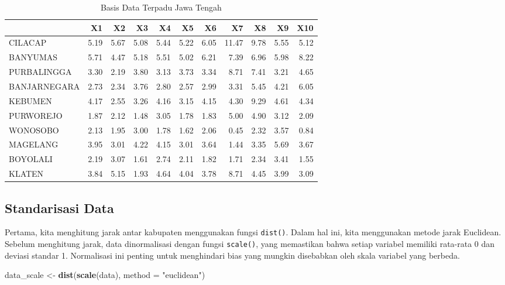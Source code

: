 \documentclass[
  oneside]{book}
\newenvironment{Shaded}{\begin{snugshade}}{\end{snugshade}}
\newcommand{\AttributeTok}[1]{\textcolor[rgb]{0.13,0.29,0.53}{#1}}
\newcommand{\FunctionTok}[1]{\textcolor[rgb]{0.13,0.29,0.53}{\textbf{#1}}}
\newcommand{\NormalTok}[1]{#1}
\newcommand{\OtherTok}[1]{\textcolor[rgb]{0.56,0.35,0.01}{#1}}
\newcommand{\StringTok}[1]{\textcolor[rgb]{0.31,0.60,0.02}{#1}}
\begin{document}
\begin{table}

\caption{\label{tab:nice-tab-2}Basis Data Terpadu Jawa Tengah}
\centering
\begin{tabular}[t]{lrrrrrrrrrr}
\toprule
  & X1 & X2 & X3 & X4 & X5 & X6 & X7 & X8 & X9 & X10\\
\midrule
CILACAP & 5.19 & 5.67 & 5.08 & 5.44 & 5.22 & 6.05 & 11.47 & 9.78 & 5.55 & 5.12\\
BANYUMAS & 5.71 & 4.47 & 5.18 & 5.51 & 5.02 & 6.21 & 7.39 & 6.96 & 5.98 & 8.22\\
PURBALINGGA & 3.30 & 2.19 & 3.80 & 3.13 & 3.73 & 3.34 & 8.71 & 7.41 & 3.21 & 4.65\\
BANJARNEGARA & 2.73 & 2.34 & 3.76 & 2.80 & 2.57 & 2.99 & 3.31 & 5.45 & 4.21 & 6.05\\
KEBUMEN & 4.17 & 2.55 & 3.26 & 4.16 & 3.15 & 4.15 & 4.30 & 9.29 & 4.61 & 4.34\\
\addlinespace
PURWOREJO & 1.87 & 2.12 & 1.48 & 3.05 & 1.78 & 1.83 & 5.00 & 4.90 & 3.12 & 2.09\\
WONOSOBO & 2.13 & 1.95 & 3.00 & 1.78 & 1.62 & 2.06 & 0.45 & 2.32 & 3.57 & 0.84\\
MAGELANG & 3.95 & 3.01 & 4.22 & 4.15 & 3.01 & 3.64 & 1.44 & 3.35 & 5.69 & 3.67\\
BOYOLALI & 2.19 & 3.07 & 1.61 & 2.74 & 2.11 & 1.82 & 1.71 & 2.34 & 3.41 & 1.55\\
KLATEN & 3.84 & 5.15 & 1.93 & 4.64 & 4.04 & 3.78 & 8.71 & 4.45 & 3.99 & 3.09\\
\bottomrule
\end{tabular}
\end{table}

\subsection*{Standarisasi Data}\label{standarisasi-data-1}

Pertama, kita menghitung jarak antar kabupaten menggunakan fungsi \texttt{dist()}. Dalam hal ini, kita menggunakan metode jarak Euclidean. Sebelum menghitung jarak, data dinormalisasi dengan fungsi \texttt{scale()}, yang memastikan bahwa setiap variabel memiliki rata-rata 0 dan deviasi standar 1. Normalisasi ini penting untuk menghindari bias yang mungkin disebabkan oleh skala variabel yang berbeda.

\begin{Shaded}
\begin{Highlighting}[]
\NormalTok{data\_scale }\OtherTok{\textless{}{-}} \FunctionTok{dist}\NormalTok{(}\FunctionTok{scale}\NormalTok{(data), }\AttributeTok{method =} \StringTok{"euclidean"}\NormalTok{)}
\end{Highlighting}
\end{Shaded}
\end{document}
